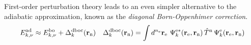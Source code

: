 \documentclass[11pt]{article}
\begin{document}
\begin{dfn}
First-order perturbation theory leads to an even simpler alternative to the adiabatic approximation, known as the \textit{diagonal Born-Oppenhimer correction}.
\begin{align}
  E_{k,\nu}^\mr{ad}
\approx
  E_{k,\nu}^\mr{bo}
+
  \D_k^\mr{dboc}(\bo{r}_\mr{n})
&&
  \D_k^\mr{dboc}(\bo{r}_\mr{n})
=
  \int
  d^{n_\mr{e}}\bo{r}_\mr{e}\,\,
  \Y_k^{\mr{e}*}(\bo{r}_\mr{e},\bo{r}_\mr{n})\,
  \op{T}^\mr{n}\,
  \Y_k^\mr{e}(\bo{r}_\mr{e},\bo{r}_\mr{n})
\end{align}
\end{dfn}
\end{document}
